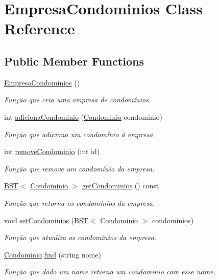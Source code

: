 \hypertarget{class_empresa_condominios}{}\section{Empresa\+Condominios Class Reference}
\label{class_empresa_condominios}
\subsection*{Public Member Functions}
\begin{DoxyCompactItemize}
\item 
\hyperlink{class_empresa_condominios_a97cb28e27d638efefa89af590a37125b}{Empresa\+Condominios} ()\hypertarget{class_empresa_condominios_a97cb28e27d638efefa89af590a37125b}{}\label{class_empresa_condominios_a97cb28e27d638efefa89af590a37125b}

\begin{DoxyCompactList}\small\item\em Função que cria uma empresa de condomínios. \end{DoxyCompactList}\item 
int \hyperlink{class_empresa_condominios_a4e031b9af04244fdc6c5391a58350f38}{adiciona\+Condominio} (\hyperlink{class_condominio}{Condominio} condominio)
\begin{DoxyCompactList}\small\item\em Função que adiciona um condomínio à empresa. \end{DoxyCompactList}\item 
int \hyperlink{class_empresa_condominios_a3cd1b44048bbe35005ca39c9bc1628a5}{remove\+Condominio} (int id)
\begin{DoxyCompactList}\small\item\em Função que remove um condomínio da empresa. \end{DoxyCompactList}\item 
\hyperlink{class_b_s_t}{B\+ST}$<$ \hyperlink{class_condominio}{Condominio} $>$ \hyperlink{class_empresa_condominios_a0f91ef9bfc09eec8e2d01afe7ade9825}{get\+Condominios} () const 
\begin{DoxyCompactList}\small\item\em Função que retorna os condomínios da empresa. \end{DoxyCompactList}\item 
void \hyperlink{class_empresa_condominios_a876bc932f07c3d44f6713b7a615d7eb2}{set\+Condominios} (\hyperlink{class_b_s_t}{B\+ST}$<$ \hyperlink{class_condominio}{Condominio} $>$ condominios)
\begin{DoxyCompactList}\small\item\em Função que atualiza os condomínios da empresa. \end{DoxyCompactList}\item 
\hyperlink{class_condominio}{Condominio} \hyperlink{class_empresa_condominios_a8fff8545c382655f72e387aed3aa3964}{find} (string nome)
\begin{DoxyCompactList}\small\item\em Função que dado um nome retorna um condominio com esse nome. \end{DoxyCompactList}\end{DoxyCompactItemize}


